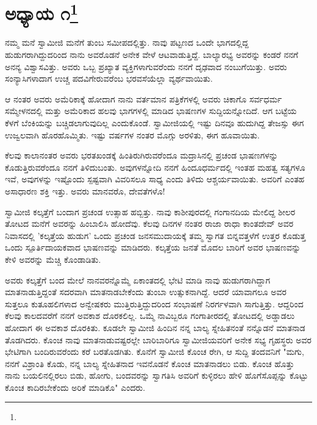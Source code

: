 
\chapter[ಅಧ್ಯಾಯ ೧]{ಅಧ್ಯಾಯ ೧\protect\footnote{}}

ನಮ್ಮ ಮನೆ ಸ್ವಾಮೀಜಿ ಮನೆಗೆ ತುಂಬ ಸಮೀಪದಲ್ಲಿತ್ತು. ನಾವು ಪಟ್ಟಣದ ಒಂದೇ ಭಾಗದಲ್ಲಿದ್ದ ಹುಡುಗರಾಗಿದ್ದುದರಿಂದ ನಾನು ಅವರೊಡನೆ ಅನೇಕ ವೇಳೆ ಆಟವಾಡುತ್ತಿದ್ದೆ. ಬಾಲ್ಯಾರಭ್ಯ ಅವರನ್ನು ಕಂಡರೆ ನನಗೆ ಅನನ್ಯ ವಿಶ್ವಾಸವಿತ್ತು. ಅವರು ಒಬ್ಬ ಪ್ರಖ್ಯಾತ ವ್ಯಕ್ತಿಗಳಾಗುವರೆಂದು ನನಗೆ ದೃಢವಾದ ನಂಬುಗೆಯಿತ್ತು. ಅವರು ಸಂನ್ಯಾಸಿಗಳಾದಾಗ ಉಚ್ಚ ಪದವಿಗೇರುವರೆಂಬ ಭರವಸೆಯೆಲ್ಲಾ ವ್ಯರ್ಥವಾಯಿತು.

ಆ ನಂತರ ಅವರು ಅಮೆರಿಕಾಕ್ಕೆ ಹೋದಾಗ ನಾನು ವರ್ತಮಾನ ಪತ್ರಿಕೆಗಳಲ್ಲಿ ಅವರು ಚಿಕಾಗೊ ಸರ್ವಧರ್ಮ ಸಮ್ಮೇಳನದಲ್ಲಿ ಮತ್ತು ಅಮೆರಿಕಾದ ಹಲವು ಭಾಗಗಳಲ್ಲಿ ಮಾಡಿದ ಭಾಷಣಗಳ ಸುದ್ದಿಯನ್ನೋದಿದೆ. ಆಗ ಬಟ್ಟೆಯ ಕೆಳಗೆ ಬೆಂಕಿಯನ್ನು ಬಚ್ಚಿಡಲಾಗುವುದಿಲ್ಲ ಎಂದುಕೊಂಡೆ. ಸ್ವಾಮೀಜಿಯಲ್ಲಿ ಇಷ್ಟು ದಿನವೂ ಹುದುಗಿದ್ದ ತೇಜಸ್ಸು ಈಗ ಉಜ್ವಲವಾಗಿ ಹೊರಹೊಮ್ಮಿತು. ಇಷ್ಟು ವರ್ಷಗಳ ನಂತರ ಮೊಗ್ಗು ಅರಳಿತು, ಈಗ ಹೂವಾಯಿತು.

ಕೆಲವು ಕಾಲಾನಂತರ ಅವರು ಭರತಖಂಡಕ್ಕೆ ಹಿಂತಿರುಗಿರುವರೆಂದೂ ಮದ್ರಾಸಿನಲ್ಲಿ ಪ್ರಚಂಡ ಭಾಷಣಗಳನ್ನು ಕೊಡುತ್ತಿರುವರೆಂದೂ ನನಗೆ ತಿಳಿದುಬಂತು. ಅವುಗಳನ್ನೋದಿ ನನಗೆ ಹಿಂದೂಧರ್ಮದಲ್ಲಿ ಇಂತಹ ಮಹತ್ವ ಸತ್ಯಗಳೂ ಇವೆ, ಅವುಗಳನ್ನು ಇಷ್ಟೊಂದು ಸ್ಪಷ್ಟವಾಗಿ ವಿವರಿಸಲೂ ಸಾಧ್ಯ ಎಂದು ತಿಳಿದು ಆಶ್ಚರ್ಯವಾಯಿತು. ಅವರಿಗೆ ಎಂತಹ ಅಸಾಧಾರಣ ಶಕ್ತಿ ಇತ್ತು. ಅವರು ಮಾನವರೊ, ದೇವತೆಗಳೊ!

ಸ್ವಾಮೀಜಿ ಕಲ್ಕತ್ತೆಗೆ ಬಂದಾಗ ಪ್ರಚಂಡ ಉತ್ಸಾಹ ಹಬ್ಬಿತ್ತು. ನಾವು ಕಾಶೀಪುರದಲ್ಲಿ ಗಂಗಾನದಿಯ ಮೇಲಿದ್ದ ಶೀಲರ ತೋಟದ ಮನೆಗೆ ಅವರನ್ನು ಹಿಂಬಾಲಿಸಿ ಹೋದೆವು. ಕೆಲವು ದಿನಗಳ ನಂತರ ರಾಜಾ ರಾಧಾ ಕಾಂತದೇವ್ ಅವರ ನಿವಾಸದಲ್ಲಿ 'ಕಲ್ಕತ್ತೆಯ ಹುಡುಗ' ಒಂದು ಪ್ರಚಂಡ ಜನಸಮುದಾಯಕ್ಕೆ ತಮ್ಮ ಸ್ವಾಗತ ಬಿನ್ನವತ್ತಳೆಗೆ ಉತ್ತರ ಕೊಡುತ್ತ ಒಂದು ಸ್ಪೂರ್ತಿದಾಯಕವಾದ ಭಾಷಣವನ್ನು ಮಾಡಿದರು. ಕಲ್ಕತ್ತೆಯ ಜನತೆ ಮೊದಲ ಬಾರಿಗೆ ಅವರ ಭಾಷಣವನ್ನು ಕೇಳಿ ಅವರನ್ನು ಮೆಚ್ಚಿ ಕೊಂಡಾಡಿತು.

ಅವರು ಕಲ್ಕತ್ತೆಗೆ ಬಂದ ಮೇಲೆ ನಾನವರನ್ನೊಮ್ಮೆ ಏಕಾಂತದಲ್ಲಿ ಭೇಟಿ ಮಾಡಿ ನಾವು ಹುಡುಗರಾಗಿದ್ದಾಗ ಮಾತನಾಡುತ್ತಿದ್ದಂತೆ ಸದರವಾಗಿ ಮಾತನಾಡಬೇಕೆಂದು ತುಂಬಾ ಉತ್ಸುಕನಾಗಿದ್ದೆ. ಆದರೆ ಯಾವಾಗಲೂ ಅವರ ಸುತ್ತಲೂ ಕುತೂಹಲಿಗಳಾದ ಅನ್ವೇಷಕರು ಮುತ್ತಿರುತ್ತಿದ್ದುದರಿಂದ ಸಂಭಾಷಣೆ ನಿರರ್ಗಳವಾಗಿ ಸಾಗುತ್ತಿತ್ತು. ಆದ್ದರಿಂದ ಕೆಲವು ಕಾಲದವರೆಗೆ ನನಗೆ ಅವಕಾಶ ದೊರಕಲಿಲ್ಲ. ಒಮ್ಮೆ ನಾವಿಬ್ಬರೂ ಗಂಗಾತೀರದಲ್ಲಿ ತೋಟದಲ್ಲಿ ಅಡ್ಡಾಡಲು ಹೋದಾಗ ಈ ಅವಕಾಶ ದೊರಕಿತು. ಕೂಡಲೇ ಸ್ವಾಮೀಜಿ ಹಿಂದಿನ ನನ್ನ ಬಾಲ್ಯ ಸ್ನೇಹಿತನಂತೆ ನನ್ನೊಡನೆ ಮಾತನಾಡ ತೊಡಗಿದರು. ಕೊಂಚ ನಾವು ಮಾತನಾಡುವಷ್ಟರಲ್ಲೇ ಬಾರಿಬಾರಿಗೂ ಸ್ವಾಮೀಜಿಯವರಿಗೆ ಅನೇಕ ಸಭ್ಯ ಗೃಹಸ್ಥರು ಅವರ ಭೇಟಿಗಾಗಿ ಬಂದಿರುವರೆಂದು ಕರೆ ಬರತೊಡಗಿತು. ಕೊನೆಗೆ ಸ್ವಾಮೀಜಿ ಕೊಂಚ ರೇಗಿ, ಆ ಸುದ್ದಿ ತಂದವನಿಗೆ "ಮಗು, ನನಗೆ ವಿಶ್ರಾಂತಿ ಕೊಡು, ನನ್ನ ಬಾಲ್ಯ ಸ್ನೇಹಿತನಾದ ಇವನೊಡನೆ ಕೊಂಚ ಮಾತನಾಡಲು ಬಿಡು. ಕೊಂಚ ಹೊತ್ತು ನಾನು ಬಯಲಿನಲ್ಲಿರಲು ಬಿಡು, ಹೋಗು, ಬಂದವರನ್ನು ಸ್ವಾಗತಿಸಿ ಅವರಿಗೆ ಕುಳ್ಳಿರಲು ಹೇಳಿ ಹೊಗೆಸೊಪ್ಪನ್ನು ಕೊಟ್ಟು ಕೊಂಚ ಕಾದಿರಬೇಕೆಂದು ಅರಿಕೆ ಮಾಡಿಕೊ" ಎಂದರು.

